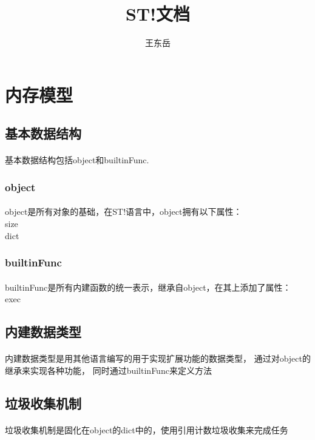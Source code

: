 \documentclass[UTF8, 12pt, a4paper]{article}
\author{王东岳}
\title{ST!文档}
\begin{document}
	\maketitle
	\newpage
	\section{内存模型}
		\subsection{基本数据结构}
			\paragraph{}
				基本数据结构包括object和builtinFunc.
		\subsubsection{object}
			\paragraph{}
				object是所有对象的基础，在ST!语言中，object拥有以下属性：
				\\ size
				\\ dict
		\subsubsection{builtinFunc}
			\paragraph{}
				builtinFunc是所有内建函数的统一表示，继承自object，在其上添加了属性：
				\\ exec
		\subsection{内建数据类型}
			\paragraph{}
				内建数据类型是用其他语言编写的用于实现扩展功能的数据类型，
				通过对object的继承来实现各种功能，
				同时通过builtinFunc来定义方法
		\subsection{垃圾收集机制}
			\paragraph{}
				垃圾收集机制是固化在object的dict中的，使用引用计数垃圾收集来完成任务
\end{document}
